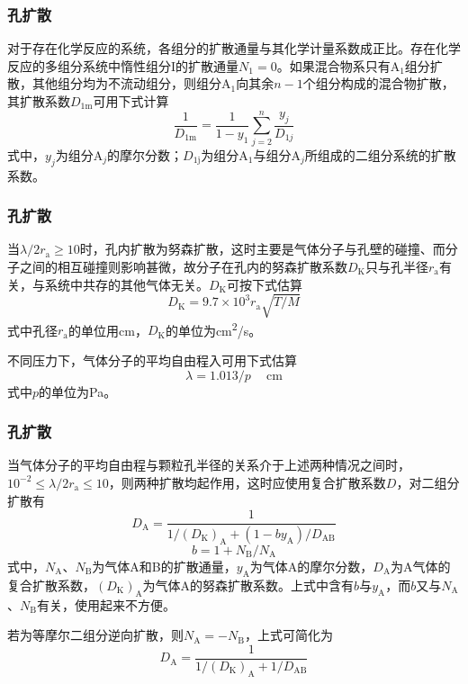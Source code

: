 \begin{frame}
    \frametitle{孔扩散}

    对于存在化学反应的系统，各组分的扩散通量与其化学计量系数成正比。存在化学反应的多组分系统中惰性组分I的扩散通量$N_1 = 0$。如果混合物系只有A$_1$组分扩散，其他组分均为不流动组分，则组分A$_1$向其余$n-1$个组分构成的混合物扩散，其扩散系数$D_\mathrm{1m}$可用下式计算
    \[
        \frac{1}{D_{1\mathrm{m}}}=\frac{1}{1-y_{1}} \sum_{j=2}^{n} \frac{y_{j}}{D_{1 j}}
    \]
    式中，$y_{j}$为组分A$_j$的摩尔分数；$D_\mathrm{1j}$为组分A$_1$与组分A$_j$所组成的二组分系统的扩散系数。

\end{frame}


\begin{frame}
    \frametitle{孔扩散}

    当$\lambda /2r_\mathrm{a} \geqslant 10$时，孔内扩散为努森扩散，这时主要是气体分子与孔壁的碰撞、而分子之间的相互碰撞则影响甚微，故分子在孔内的努森扩散系数$D_\mathrm{K}$只与孔半径$r_\mathrm{a}$有关，与系统中共存的其他气体无关。$D_\mathrm{K}$可按下式估算
    \[
        D_{\mathrm{K}}=9.7 \times 10^{3} r_{\mathrm{a}} \sqrt{T / M} 
    \]
    式中孔径$r_\mathrm{a}$的单位用cm，$D_\mathrm{K}$的单位为\si{cm^2/s}。
    
    不同压力下，气体分子的平均自由程入可用下式估算
    \[
        \lambda=1.013 / p \quad \mathrm{~cm}
    \]
    式中$p$的单位为Pa。

\end{frame}


\begin{frame}
    \frametitle{孔扩散}

    当气体分子的平均自由程与颗粒孔半径的关系介于上述两种情况之间时，$10^{-2} \leqslant \lambda /2r_\mathrm{a} \leqslant 10$，则两种扩散均起作用，这时应使用复合扩散系数$D$，对二组分扩散有
    \[
        D_{\mathrm{A}}=\frac{1}{1 /(D_{\mathrm{K}})_{\mathrm{A}}+(1-b y_{\mathrm{A}}) / D_{\mathrm{AB}}}
    \]
    \vspace{-10 pt}    
    \[
        b=1+N_{\mathrm{B}} / N_{\mathrm{A}}
    \]
    式中，$N_{\mathrm{A}}$、$N_{\mathrm{B}}$为气体A和B的扩散通量，$y_{\mathrm{A}}$为气体A的摩尔分数，$D_{\mathrm{A}}$为A气体的复合扩散系数，$(D_{\mathrm{K}})_{\mathrm{A}}$为气体A的努森扩散系数。上式中含有$b$与$y_{\mathrm{A}}$，而$b$又与$N_{\mathrm{A}}$、$N_{\mathrm{B}}$有关，使用起来不方便。
    
    若为等摩尔二组分逆向扩散，则$N_{\mathrm{A}} = -N_{\mathrm{B}}$，上式可简化为
    \[
        D_{\mathrm{A}}=\frac{1}{1 /(D_{\mathrm{K}})_{\mathrm{A}}+1 / {D}_{\mathrm{AB}}}
    \]

\end{frame}


